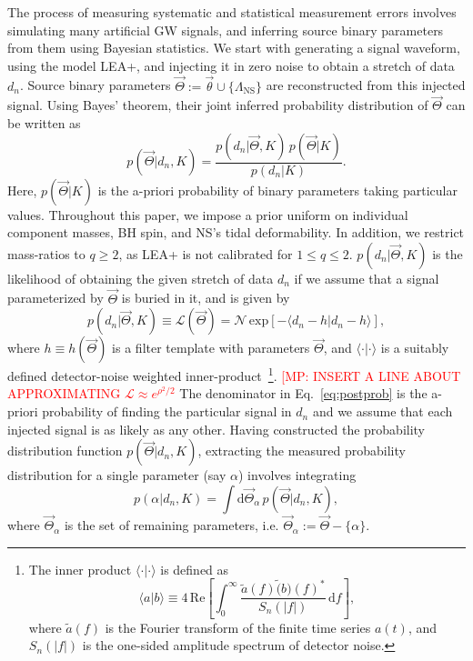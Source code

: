 \documentclass[aps,prd,amsmath,floats,floatfix, twocolumn,
superscriptaddress,nofootinbib,showpacs]{revtex4-1}
\newcommand{\red}{\textcolor{red}}
\newcommand{\D}{\mathrm{d}}
\newcommand{\lambdans}{\Lambda_\mathrm{NS}}
\newcommand{\LL}{\mathcal{L}}
\begin{document}
The process of measuring systematic and statistical measurement errors
involves simulating many artificial GW signals, and inferring source binary
parameters from them using Bayesian statistics.
We start with generating a signal waveform, using the model LEA+, and injecting
it in zero noise to obtain a stretch of data $d_n$. Source binary parameters
$\vec{\Theta}:=\vec{\theta}\cup\{\lambdans\}$ are reconstructed from this
injected signal. Using Bayes' theorem, their joint inferred probability
distribution of $\vec{\Theta}$ can be written	 as
\begin{equation}\label{eq:postprob}
 p(\vec{\Theta} | d_n, K) = \dfrac{p(d_n|\vec{\Theta}, K)\,p(\vec{\Theta} | K)}{p(d_n|K)}.
\end{equation}
Here, $p(\vec{\Theta} | K)$ is the a-priori probability of binary parameters
taking particular values. Throughout this paper, we impose a prior uniform on
individual component masses, BH spin, and NS's tidal deformability. In
addition, we restrict mass-ratios to $q\geq 2$, as LEA+ is not calibrated for 
$1\leq q\leq 2$. $p(d_n|\vec{\Theta}, K)$ is the
likelihood of obtaining the given stretch of data $d_n$ if we assume that a
signal parameterized by $\vec{\Theta}$ is buried in it, and is given by
\begin{equation}\label{eq:likelihood}
 p(d_n| \vec{\Theta}, K) \equiv \LL(\vec{\Theta}) = \mathcal{N}\, \mathrm{exp}[- \langle d_n - h | d_n - h\rangle ],
\end{equation}
where $h\equiv h(\vec{\Theta})$ is a filter template with parameters 
$\vec{\Theta}$, and $\langle\cdot|\cdot\rangle$ is a suitably defined
detector-noise weighted inner-product~\footnote{The inner product
$\langle\cdot|\cdot\rangle$  is defined as
\begin{equation}
\langle a|b\rangle \equiv 4\,\mathrm{Re}\left[\int_0^\infty \dfrac{\tilde{a}(f) \tilde(b)(f)^*}{S_n(|f|)}\,\D f\right],
\end{equation}
where $\tilde{a}(f)$ is the Fourier transform of the finite time series $a(t)$,
and $S_n(|f|)$ is the one-sided amplitude spectrum of detector noise.}.
\red{[MP: INSERT A LINE ABOUT APPROXIMATING $\LL \approx e^{\rho^2/2}$}
The denominator in Eq.~\ref{eq:postprob} is the a-priori probability of finding
the particular signal in $d_n$ and we assume that each injected signal is as
likely as any other. Having constructed the probability distribution function
$p(\vec{\Theta} | d_n, K)$, extracting the measured probability distribution
for a single parameter (say $\alpha$) involves integrating
\begin{equation}\label{eq:marginalize}
 p(\alpha | d_n, K) = \int\D \vec{\Theta}_\alpha\, p(\vec{\Theta} | d_n, K),
\end{equation}
where $\vec{\Theta}_\alpha$ is the set of remaining parameters, i.e.
$\vec{\Theta}_\alpha:=\vec{\Theta} - \{\alpha\}$.
\end{document}
